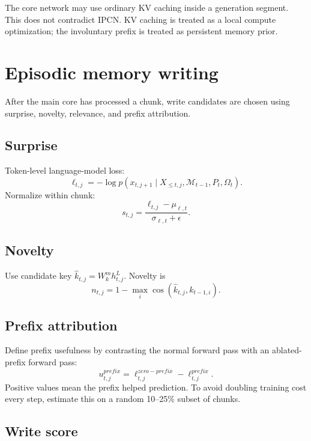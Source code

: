 \documentclass[11pt]{article}
\newcommand{\cosine}{\operatorname{cos}}
\newcommand{\Mem}{\mathcal{M}}
\begin{document}
The core network may use ordinary KV caching inside a generation segment. This does not contradict IPCN. KV caching is treated as a local compute optimization; the involuntary prefix is treated as persistent memory prior.

\section{Episodic memory writing}

After the main core has processed a chunk, write candidates are chosen using surprise, novelty, relevance, and prefix attribution.

\subsection{Surprise}

Token-level language-model loss:
\begin{equation}
    \ell_{t,j}=-\log p(x_{t,j+1}\mid X_{\le t,j},\Mem_{t-1},P_t,\Omega_t).
\end{equation}
Normalize within chunk:
\begin{equation}
    s_{t,j}=\frac{\ell_{t,j}-\mu_{\ell,t}}{\sigma_{\ell,t}+\epsilon}.
\end{equation}

\subsection{Novelty}

Use candidate key \(\hat{k}_{t,j}=W_k^m h_{t,j}^L\). Novelty is
\begin{equation}
    n_{t,j}=1-\max_i \cosine(\hat{k}_{t,j},k_{t-1,i}).
\end{equation}

\subsection{Prefix attribution}

Define prefix usefulness by contrasting the normal forward pass with an ablated-prefix forward pass:
\begin{equation}
    u^{prefix}_{t,j}=\ell^{zero-prefix}_{t,j}-\ell^{prefix}_{t,j}.
\end{equation}
Positive values mean the prefix helped prediction. To avoid doubling training cost every step, estimate this on a random 10--25\% subset of chunks.

\subsection{Write score}
\end{document}

